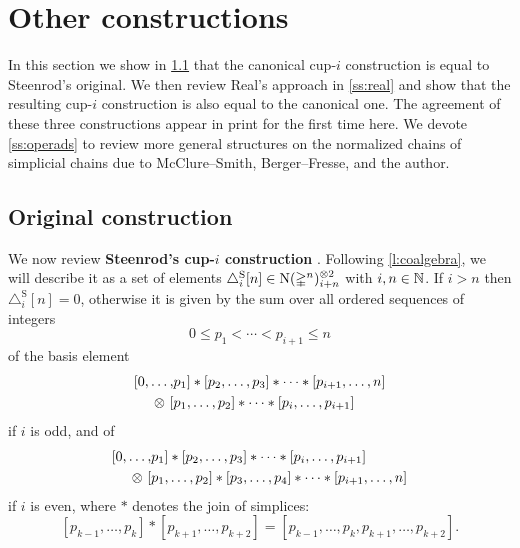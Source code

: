 
\section{Other constructions} \label{s:others}

In this section we show in \cref{ss:original} that the canonical \mbox{cup-$i$} construction is equal to Steenrod's original.
We then review Real's approach in \cref{ss:real} and show that the resulting \mbox{cup-$i$} construction is also equal to the canonical one.
The agreement of these three constructions appear in print for the first time here.
We devote \cref{ss:operads} to review more general structures on the normalized chains of simplicial chains due to McClure--Smith, Berger--Fresse, and the author.

\subsection{Original construction} \label{ss:original}

We now review \textbf{Steenrod's \mbox{cup-$i$} construction} \cite[p.293]{steenrod1947products}.
Following \cref{l:coalgebra}, we will describe it as a set of elements $\triangle_i^{\mathrm{S}} [n] \in \operatorname{N}(\mathbb{\Delta}^n)^{\otimes 2}_{i+n}$ with $i,n \in \mathbb{N}$.
If $i > n$ then $\triangle_i^{\mathrm{S}} [n] = 0$, otherwise it is given by the sum over all ordered sequences of integers
\[
0 \leq p_1 < \cdots < p_{i+1} \leq n
\]
of the basis element
\begin{equation} \label{e:original i odd}
\begin{split}
[ 0, \dots, &{p_1} ] \ast [ {p_2}, \dots, {p_3} ] \ast \cdots \ast [ {p_{i+1}}, \dots, n ] \\
\otimes \ [ &{p_1}, \dots, {p_2} ] \ast \cdots \ast [ {p_{i}}, \dots, {p_{i+1}} ]
\end{split}
\end{equation}
if $i$ is odd, and of
\begin{equation} \label{e:original i even}
\begin{split}
[ 0, \dots, &{p_1} ] \ast [ {p_2}, \dots, {p_3} ] \ast \cdots \ast [ {p_{i}}, \dots, {p_{i+1}} ] \\
\otimes \ [ &{p_1}, \dots, {p_2} ] \ast [ {p_3}, \dots, {p_4} ] \ast \cdots \ast [ {p_{i+1}}, \dots, n ]
\end{split}
\end{equation}
if $i$ is even, where $\ast$ denotes the join of simplices:
\[
[{p_{k-1}}, \dots, {p_{k}} ] \ast [ {p_{k+1}}, \dots, p_{k+2}] = [{p_{k-1}}, \dots, p_k, p_{k+1}, \dots, p_{k+2}].
\]

